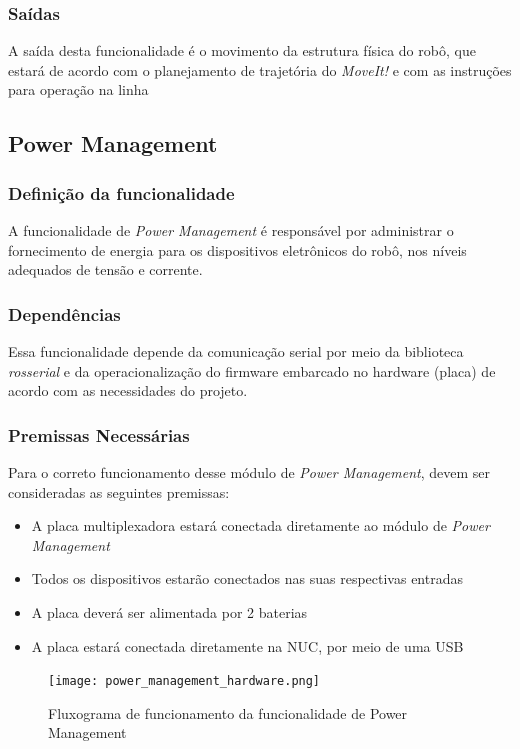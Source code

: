 \subsubsection{Saídas}
A saída desta funcionalidade é o movimento da estrutura física do robô, que estará de acordo com o planejamento de trajetória do \textit{MoveIt!} e com as instruções para operação na linha

\subsection{Power Management}
\label{ssec:power}
\subsubsection{Definição da funcionalidade}

A funcionalidade de \textit{Power Management} é responsável por administrar o fornecimento de energia para os dispositivos eletrônicos do robô, nos níveis adequados de tensão e corrente.

\subsubsection{Dependências}
Essa funcionalidade depende da comunicação serial por meio da biblioteca \textit{rosserial} e da operacionalização do firmware embarcado no hardware (placa) de acordo com as necessidades do projeto.

\subsubsection{Premissas Necessárias}
Para o correto funcionamento desse módulo de \textit{Power Management}, devem ser consideradas as seguintes premissas:
\begin{itemize}
	\item A placa multiplexadora estará conectada diretamente ao módulo de \textit{Power Management} 
	\item Todos os dispositivos estarão conectados nas suas respectivas entradas
	\item A placa deverá ser alimentada por 2 baterias
	\item A placa estará conectada diretamente na NUC, por meio de uma USB	
\end{itemize}
\begin{figure}[h]
	\centering
	\texttt{[image: power\_management\_hardware.png]}
	\caption{Fluxograma de funcionamento da funcionalidade de Power Management}
	\label{fig:power_management_hardware}
\end{figure}
